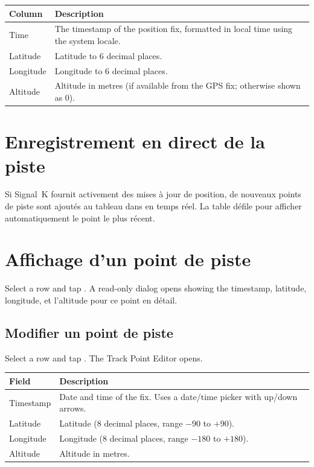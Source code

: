 \begin{longtable}{L{2.4cm} L{11.3cm}}
\toprule
{}
{\sffamily\bfseries\color{white} Column} &
{\sffamily\bfseries\color{white} Description} \\
\midrule
Time & The timestamp of the position fix, formatted in local time using the system locale. \\
Latitude & Latitude to 6 decimal places. \\
Longitude & Longitude to 6 decimal places. \\
Altitude & Altitude in metres (if available from the GPS fix; otherwise shown as 0). \\
\bottomrule
\end{longtable}

\section{Enregistrement en direct de la piste}

Si Signal~K fournit activement des mises à jour de position, de nouveaux points de piste sont ajoutés au tableau dans
en temps réel.
La table défile pour afficher automatiquement le point le plus récent.

\section{Affichage d'un point de piste}

Select a row and tap . A read-only dialog opens showing the timestamp, latitude, longitude,
et l'altitude pour ce point en détail.

\subsection{Modifier un point de piste}

Select a row and tap . The Track Point Editor opens.

\begin{longtable}{L{3cm} L{10.7cm}}
\toprule
{}
{\sffamily\bfseries\color{white} Field} &
{\sffamily\bfseries\color{white} Description} \\
\midrule
Timestamp & Date and time of the fix. Uses a date/time picker with up/down arrows. \\
Latitude & Latitude (8 decimal places, range $-90$ to $+90$). \\
Longitude & Longitude (8 decimal places, range $-180$ to $+180$). \\
Altitude & Altitude in metres. \\
\bottomrule
\end{longtable}

